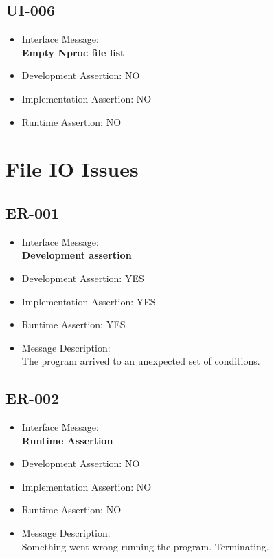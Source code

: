 \subsection{UI-006}
\begin{itemize}
  \item Interface Message:\\[1em]
    \textbf{Empty Nproc file list}
  \item Development Assertion: NO
  \item Implementation Assertion: NO
  \item Runtime Assertion: NO
\end{itemize}

\section{File IO Issues}

\subsection{ER-001}
\begin{itemize}
  \item Interface Message:\\[1em]
    \textbf{Development assertion}
  \item Development Assertion: YES
  \item Implementation Assertion: YES
  \item Runtime Assertion: YES
  \item Message Description:\\[1em]
    The program arrived to an unexpected set of conditions.
\end{itemize}

\subsection{ER-002}
\begin{itemize}
  \item Interface Message:\\[1em]
    \textbf{Runtime Assertion}
  \item Development Assertion: NO
  \item Implementation Assertion: NO
  \item Runtime Assertion: NO
  \item Message Description:\\[1em]
    Something went wrong running the program. Terminating.
\end{itemize}

